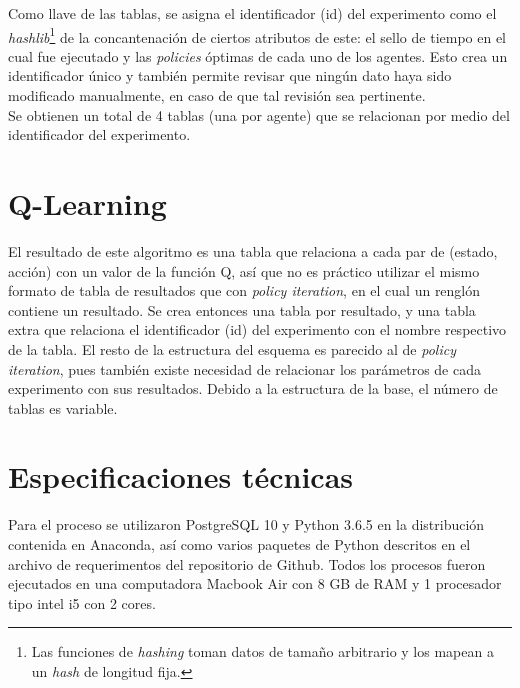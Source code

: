 Como llave de las tablas, se asigna el identificador (id) del experimento como el \textit{hashlib}\footnote{Las funciones de \textit{hashing} toman datos de tama\~no arbitrario y los mapean a un \textit{hash} de longitud fija.} de la concantenaci\'on de ciertos atributos de este: el sello de tiempo en el cual fue ejecutado y las \textit{policies} \'optimas de cada uno de los agentes. Esto crea un identificador \'unico y tambi\'en permite revisar que ning\'un dato haya sido modificado manualmente, en caso de que tal revisi\'on sea pertinente.\\

Se obtienen un total de 4 tablas (una por agente) que se relacionan por medio del identificador del experimento.\\




\section{Q-Learning}

El resultado de este algoritmo es una tabla que relaciona a cada par de (estado, acci\'on) con un valor de la funci\'on Q, as\'i que no es pr\'actico utilizar el mismo formato de tabla de resultados que con \textit{policy iteration}, en el cual un rengl\'on contiene un resultado. Se crea entonces una tabla por resultado, y una tabla extra que relaciona el identificador (id) del experimento con el nombre respectivo de la tabla. El resto de la estructura del esquema es parecido al de \textit{policy iteration}, pues tambi\'en existe necesidad de relacionar los par\'ametros de cada experimento con sus resultados. Debido a la estructura de la base, el n\'umero de tablas es variable.\\

\section{Especificaciones t\'ecnicas}

Para el proceso se utilizaron PostgreSQL 10 y Python 3.6.5 en la distribuci\'on contenida en Anaconda, as\'i como varios paquetes de Python descritos en el archivo de requerimentos del repositorio de Github. Todos los procesos fueron ejecutados en una computadora Macbook Air con 8 GB de RAM y 1 procesador tipo intel i5 con 2 cores.
